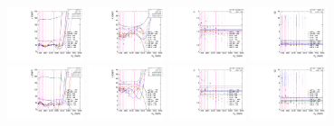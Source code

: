 \begin{figure}[htbp]
  \centering
  \includegraphics[width=0.2\textwidth]{fig/analysisAppendix/paramSignalShape_allSig_MJJ_HP_bb_LDy_mean.pdf}
  \includegraphics[width=0.2\textwidth]{fig/analysisAppendix/paramSignalShape_allSig_MJJ_HP_bb_LDy_sigma.pdf}
  \includegraphics[width=0.2\textwidth]{fig/analysisAppendix/paramSignalShape_allSig_MJJ_HP_bb_LDy_alpha.pdf}
  \includegraphics[width=0.2\textwidth]{fig/analysisAppendix/paramSignalShape_allSig_MJJ_HP_bb_LDy_alpha2.pdf}\\
  \includegraphics[width=0.2\textwidth]{fig/analysisAppendix/paramSignalShape_allSig_MJJ_LP_bb_LDy_mean.pdf}
  \includegraphics[width=0.2\textwidth]{fig/analysisAppendix/paramSignalShape_allSig_MJJ_LP_bb_LDy_sigma.pdf}
  \includegraphics[width=0.2\textwidth]{fig/analysisAppendix/paramSignalShape_allSig_MJJ_LP_bb_LDy_alpha.pdf}
  \includegraphics[width=0.2\textwidth]{fig/analysisAppendix/paramSignalShape_allSig_MJJ_LP_bb_LDy_alpha2.pdf}\\

\end{figure}
